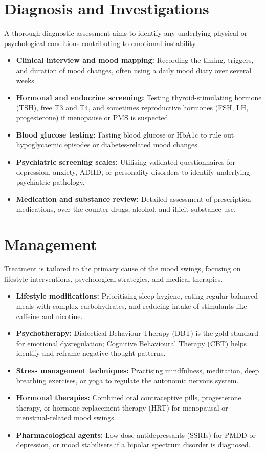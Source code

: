 \section*{Diagnosis and Investigations}
A thorough diagnostic assessment aims to identify any underlying physical or psychological conditions contributing to emotional instability.
\begin{itemize}
    \item \textbf{Clinical interview and mood mapping:} Recording the timing, triggers, and duration of mood changes, often using a daily mood diary over several weeks.
    \item \textbf{Hormonal and endocrine screening:} Testing thyroid-stimulating hormone (TSH), free T3 and T4, and sometimes reproductive hormones (FSH, LH, progesterone) if menopause or PMS is suspected.
    \item \textbf{Blood glucose testing:} Fasting blood glucose or HbA1c to rule out hypoglycaemic episodes or diabetes-related mood changes.
    \item \textbf{Psychiatric screening scales:} Utilising validated questionnaires for depression, anxiety, ADHD, or personality disorders to identify underlying psychiatric pathology.
    \item \textbf{Medication and substance review:} Detailed assessment of prescription medications, over-the-counter drugs, alcohol, and illicit substance use.
\end{itemize}

\section*{Management}
Treatment is tailored to the primary cause of the mood swings, focusing on lifestyle interventions, psychological strategies, and medical therapies.
\begin{itemize}
    \item \textbf{Lifestyle modifications:} Prioritising sleep hygiene, eating regular balanced meals with complex carbohydrates, and reducing intake of stimulants like caffeine and nicotine.
    \item \textbf{Psychotherapy:} Dialectical Behaviour Therapy (DBT) is the gold standard for emotional dysregulation; Cognitive Behavioural Therapy (CBT) helps identify and reframe negative thought patterns.
    \item \textbf{Stress management techniques:} Practising mindfulness, meditation, deep breathing exercises, or yoga to regulate the autonomic nervous system.
    \item \textbf{Hormonal therapies:} Combined oral contraceptive pills, progesterone therapy, or hormone replacement therapy (HRT) for menopausal or menstrual-related mood swings.
    \item \textbf{Pharmacological agents:} Low-dose antidepressants (SSRIs) for PMDD or depression, or mood stabilisers if a bipolar spectrum disorder is diagnosed.
\end{itemize}

